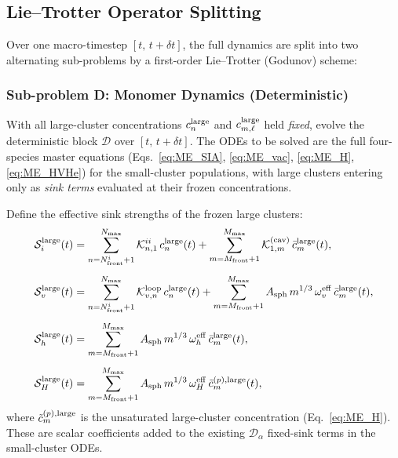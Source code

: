 \subsection{Lie--Trotter Operator Splitting}
\label{sec:hybrid_splitting}

Over one macro-timestep $[t,\, t + \delta t]$, the full dynamics
are split into two alternating sub-problems by a first-order
Lie--Trotter (Godunov) scheme:

\subsubsection{Sub-problem D: Monomer Dynamics (Deterministic)}
\label{sec:subD}

With all large-cluster concentrations $c_n^{\rm large}$ and
$c_{m,\ell}^{\rm large}$ held \emph{fixed}, evolve the deterministic
block $\mathcal{D}$ over $[t,\, t+\delta t]$.  The ODEs to be solved
are the full four-species master equations
(Eqs.~\ref{eq:ME_SIA}, \ref{eq:ME_vac}, \ref{eq:ME_H},
\ref{eq:ME_HVHe}) for the small-cluster populations, with large
clusters entering only as \emph{sink terms} evaluated at their
frozen concentrations.

Define the effective sink strengths of the frozen large clusters:
\begin{align}
    \mathcal{S}_i^{\rm large}(t)
    &= \sum_{n=N_{\rm front}^i+1}^{N_{\max}}
       \mathcal{K}_{n,1}^{ii}\,c_n^{\rm large}(t)
     + \sum_{m=M_{\rm front}+1}^{M_{\max}}
       \mathcal{K}_{1,m}^{(\rm cav)}\,\bar{c}_m^{\rm large}(t),
    \label{eq:Si_large}\\[4pt]
    \mathcal{S}_v^{\rm large}(t)
    &= \sum_{n=N_{\rm front}^i+1}^{N_{\max}}
       \mathcal{K}_{v,n}^{\rm loop}\,c_n^{\rm large}(t)
     + \sum_{m=M_{\rm front}+1}^{M_{\max}}
       A_{\rm sph}\,m^{1/3}\,\omega_v^{\rm eff}\,
       \bar{c}_m^{\rm large}(t),
    \label{eq:Sv_large}\\[4pt]
    \mathcal{S}_h^{\rm large}(t)
    &= \sum_{m=M_{\rm front}+1}^{M_{\max}}
       A_{\rm sph}\,m^{1/3}\,\omega_h^{\rm eff}\,
       \bar{c}_m^{\rm large}(t),
    \label{eq:Sh_large}\\[4pt]
    \mathcal{S}_H^{\rm large}(t)
    &= \sum_{m=M_{\rm front}+1}^{M_{\max}}
       A_{\rm sph}\,m^{1/3}\,\omega_H^{\rm eff}\,
       \tilde{c}_m^{(p),\rm large}(t),
    \label{eq:SH_large}
\end{align}
where $\tilde{c}_m^{(p),\rm large}$ is the unsaturated large-cluster
concentration (Eq.~\ref{eq:ME_H}).  These are scalar coefficients
added to the existing $\mathcal{D}_\alpha$ fixed-sink terms in the
small-cluster ODEs.

